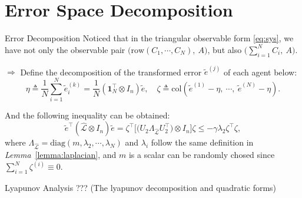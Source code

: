 \section{Error Space Decomposition}
\begin{frame}{Error Decomposition}
    Noticed that in the triangular observable form \eqref{eq:sys}, we have not only the observable pair $\Big(\mathrm{row}(C_1,\cdots,C_N),\ A\Big)$, but also $\Big(\sum^N_{i=1}C_i,\ A\Big)$.

    $\Longrightarrow$ Define the decomposition of the transformed error $\tilde{e}^{(j)}$ of each agent below:
    \[\eta \triangleq \frac{1}{N}\sum^N_{i=1}\tilde{e}^{(k)}_{i}=\frac{1}{N}(\mathbf{1}_N^\top\otimes I_{n})\tilde{e},\quad\zeta\triangleq\mathrm{col}(\tilde{e}^{(1)}-\eta,\ \cdots,\ \tilde{e}^{(N)}-\eta).\]
    
    And the following inequality can be obtained:
    \[\tilde{e}^\top(\hat{\mathcal{L}}\otimes I_n)\tilde{e}=\zeta^\top\Big[\big(U_2\Lambda_{\hat{\mathcal{L}}}U_2^\top\big)\otimes I_n\Big]\zeta\le-\gamma \lambda_2\zeta^\top\zeta, \]
    where $\Lambda_{\hat{\mathcal{L}}}=\mathrm{diag}(m,\lambda_2,\cdots,\lambda_N)$ and $\lambda_i$ follow the same definition in {\it Lemma}~\ref{lemma:laplacian}, and $m$ is a scalar can be randomly chosed since $\sum^N_{i=1}\zeta^{(i)}\equiv0$.
\end{frame}

\begin{frame}{Lyapunov Analysis}
    ??? (The lyapunov decomposition and quadratic forms)
\end{frame}

